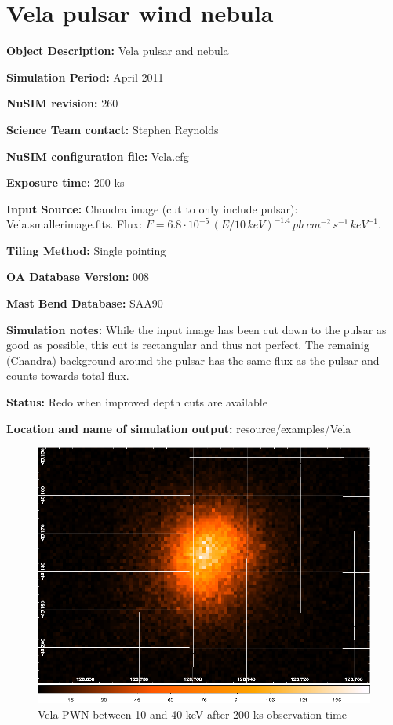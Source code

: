 
\newpage

\section{Vela pulsar wind nebula}

\textbf{Object Description:} Vela pulsar and nebula

\textbf{Simulation Period:} April 2011

\textbf{NuSIM revision:} 260

\textbf{Science Team contact:} Stephen Reynolds

\textbf{NuSIM configuration file:} Vela.cfg

\textbf{Exposure time:} 200 ks

\textbf{Input Source:} 
Chandra image (cut to only include pulsar): Vela.smallerimage.fits.
Flux: $F = 6.8\cdot10^{-5}\,(E/10\,keV)^{-1.4}\,ph\,cm^{-2}\,s^{-1}\,keV^{-1}$.

\textbf{Tiling Method:} Single pointing

\textbf{OA Database Version:} 008

\textbf{Mast Bend Database:} SAA90

\textbf{Simulation notes:} While the input image has been cut down to the pulsar as good as possible, this cut is rectangular and thus not perfect. The remainig (Chandra) background around the pulsar has the same flux as the pulsar and counts towards total flux.

\textbf{Status:} 
Redo when improved depth cuts are available

\textbf{Location and name of simulation output:} resource/examples/Vela

\begin{figure}[h]
\begin{center}
\includegraphics[width=14cm]{Vela/Vela.png}
\caption{Vela PWN between 10 and 40 keV after 200 ks observation time}
\label{Vela} 
\end{center}
\end{figure}

